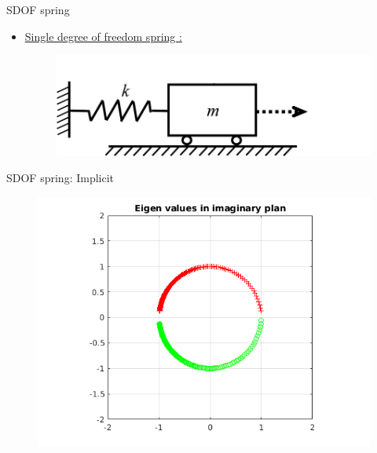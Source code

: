 \begin{frame}{SDOF spring}
\begin{itemize}
\item \underline{Single degree of freedom spring :}
\begin{figure}
\centering
\includegraphics[width=0.5\linewidth]{images/sdof-spring.png}
\end{figure}
\end{itemize}
\end{frame}
\begin{frame}{SDOF spring: Implicit}
\begin{figure}[ht] 
  \label{ fig7} 
  \begin{minipage}[b]{0.5\linewidth}
    \centering
    \includegraphics[scale=.35]{images/sdof-imp-1.png} \\


\end{minipage}
\end{figure}
\end{frame}
